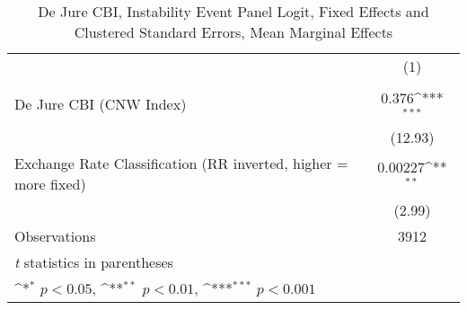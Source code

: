 \begin{table}[htbp]\centering
\def\sym#1{\ifmmode^{#1}\else\(^{#1}\)\fi}
\caption{De Jure CBI, Instability Event Panel Logit, Fixed Effects and Clustered Standard Errors, Mean Marginal Effects \label{margsJustBinInstabEventDJ}}
\begin{tabular*}{\linewidth}{@{\hskip\tabcolsep\extracolsep\fill}l*{1}{c}}
\toprule
                &\multicolumn{1}{c}{(1)}\\
                &\multicolumn{1}{c}{}\\
\midrule
De Jure CBI (CNW Index)&    0.376\sym{***}\\
                &  (12.93)         \\
\addlinespace
Exchange Rate Classification (RR inverted, higher = more fixed)&  0.00227\sym{**} \\
                &   (2.99)         \\
\midrule
Observations    &     3912         \\
\bottomrule
\multicolumn{2}{l}{\footnotesize \textit{t} statistics in parentheses}\\
\multicolumn{2}{l}{\footnotesize \sym{*} \(p<0.05\), \sym{**} \(p<0.01\), \sym{***} \(p<0.001\)}\\
\end{tabular*}
\end{table}
